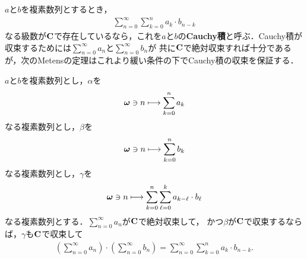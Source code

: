 	$a$と$b$を複素数列とするとき，
	\begin{align}
		\sum_{n=0}^\infty \sum_{k=0}^n a_k \cdot b_{n-k}
	\end{align}
	なる級数が$\mathbf{C}$で存在しているなら，これを$a$と$b$の{\bf Cauchy積}と呼ぶ．Cauchy積が収束するためには$\sum_{n=0}^\infty a_n$と$\sum_{n=0}^\infty b_n$が
	共に$\mathbf{C}$で絶対収束すれば十分であるが，次のMetensの定理はこれより緩い条件の下でCauchy積の収束を保証する．
	
	\begin{screen}
		\begin{thm}[一方が絶対収束していればCauchy積も収束する]\label{thm:convolution_of_absolutely_convergent_series}
			$a$と$b$を複素数列とし，$\alpha$を
			\begin{align}
				{\boldsymbol \omega} \ni n \longmapsto \sum_{k=0}^n a_k
			\end{align}
			なる複素数列とし，$\beta$を
			\begin{align}
				{\boldsymbol \omega} \ni n \longmapsto \sum_{k=0}^n b_k
			\end{align}
			なる複素数列とし，$\gamma$を
			\begin{align}
				{\boldsymbol \omega} \ni n \longmapsto \sum_{k=0}^n \sum_{\ell = 0}^k a_{k-\ell} \cdot b_\ell
			\end{align}
			なる複素数列とする．$\sum_{n=0}^\infty a_n$が$\mathbf{C}$で絶対収束して，
			かつ$\beta$が$\mathbf{C}$で収束するならば，$\gamma$も$\mathbf{C}$で収束して
			\begin{align}
				\left(\sum_{n=0}^\infty a_n\right) \cdot \left(\sum_{n=0}^\infty b_n\right)
				= \sum_{n=0}^\infty \sum_{k=0}^n a_k \cdot b_{n-k}.
			\end{align}
		\end{thm}
	\end{screen}
	
